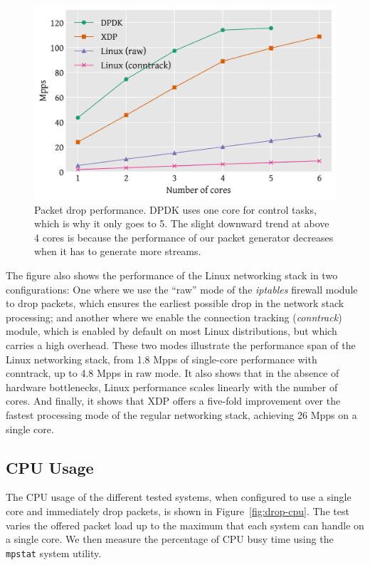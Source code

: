 \documentclass[10pt,sigconf,anonymous]{acmart}
\begin{document}
\begin{figure}[t]
\centering
\includegraphics[width=\linewidth]{figures/drop-test.pdf}
\caption{\label{fig:drop-test} Packet drop performance. DPDK uses one core for
  control tasks, which is why it only goes to 5. The slight downward trend at
  above 4 cores is because the performance of our packet generator decreases
  when it has to generate more streams.}
\end{figure}


The figure also shows the performance of the Linux networking stack in two
configurations: One where we use the ``raw'' mode of the \emph{iptables}
firewall module to drop packets, which ensures the earliest possible drop in the
network stack processing; and another where we enable the connection tracking
(\emph{conntrack}) module, which is enabled by default on most Linux
distributions, but which carries a high overhead. These two modes illustrate the
performance span of the Linux networking stack, from 1.8 Mpps of single-core
performance with conntrack, up to 4.8 Mpps in raw mode. It also shows that in
the absence of hardware bottlenecks, Linux performance scales linearly with the
number of cores. And finally, it shows that XDP offers a five-fold improvement
over the fastest processing mode of the regular networking stack, achieving 26
Mpps on a single core.


\subsection{CPU Usage}
\label{sec:cpu-usage}

The CPU usage of the different tested systems, when configured to use a single
core and immediately drop packets, is shown in Figure~\ref{fig:drop-cpu}. The
test varies the offered packet load up to the maximum that each system can
handle on a single core. We then measure the percentage of CPU busy time using
the \texttt{mpstat} system utility.
\end{document}
